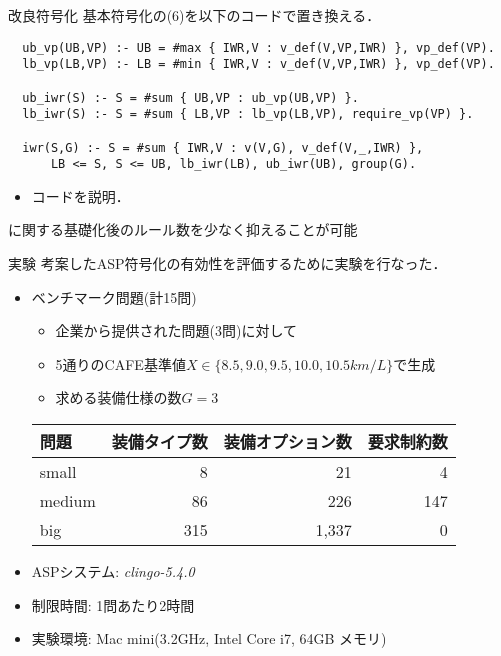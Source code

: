 \documentclass[dvipdfmx, 11pt]{beamer}
\begin{document}
\begin{frame}[fragile]{改良符号化}
 基本符号化の(6)を以下のコードで置き換える．
\begin{exampleblock}{}
 \footnotesize
 \begin{lstlisting}
  ub_vp(UB,VP) :- UB = #max { IWR,V : v_def(V,VP,IWR) }, vp_def(VP).
  lb_vp(LB,VP) :- LB = #min { IWR,V : v_def(V,VP,IWR) }, vp_def(VP).

  ub_iwr(S) :- S = #sum { UB,VP : ub_vp(UB,VP) }.
  lb_iwr(S) :- S = #sum { LB,VP : lb_vp(LB,VP), require_vp(VP) }.

  iwr(S,G) :- S = #sum { IWR,V : v(V,G), v_def(V,_,IWR) },
      LB <= S, S <= UB, lb_iwr(LB), ub_iwr(UB), group(G).
 \end{lstlisting}
\end{exampleblock}
 \begin{itemize}
  \item コードを説明．
 \end{itemize}
 \begin{block}{}
  に関する基礎化後のルール数を少なく抑えることが可能
 \end{block}
\end{frame}
\begin{frame}{実験}
 考案したASP符号化の有効性を評価するために実験を行なった．
 \begin{itemize}
  \item ベンチマーク問題(計15問)
	\begin{itemize}
	 \item 企業から提供された問題(3問)に対して
	 \item 5通りのCAFE基準値$X \in \{8.5, 9.0, 9.5, 10.0, 10.5km/L\}$で生成
	 \item 求める装備仕様の数$G = 3$
	\end{itemize}
	\begin{exampleblock}\small
	 \centering
	 \begin{tabular}{ l|r r r }
	  問題		& 装備タイプ数	& 装備オプション数& 要求制約数 	\\ \hline
	  small	        & 8     	& 21		& 4		\\
	  medium	& 86		& 226		& 147	\\
	  big		& 315		& 1,337		& 0		\\
	 \end{tabular}
	\end{exampleblock}
  \item ASPシステム: \textit{clingo-5.4.0}
  \item 制限時間: 1問あたり2時間
  \item 実験環境: Mac mini(3.2GHz, Intel Core i7, 64GB メモリ)
 \end{itemize}
\end{frame}
\end{document}
